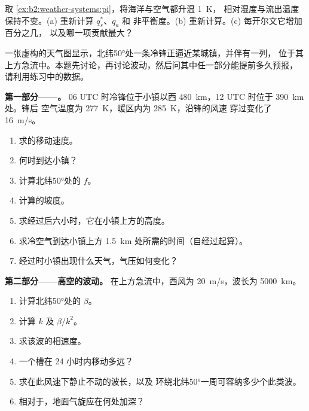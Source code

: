\begin{exercise}[$\star\star\star$]\label{exo:b2:weather-systems:12}
取 \cref{ex:b2:weather-systems:pi}，将海洋与空气都升温 \qty{1}{K}，
相对湿度与流出温度保持不变。(a) 重新计算 $q_s^*$、$q_a$ 和
非平衡度。(b) 重新计算。(c) 每开尔文它增加百分之几，
以及哪一项贡献最大？
\end{exercise}

\begin{problem}\label{pb:b2:weather-systems:1}
一张虚构的天气图显示，北纬\ang{50}处一条冷锋正逼近某城镇，并伴有一列，
位于其上方急流中。本题先讨论，再讨论波动，然后问其中任一部分能提前多久预报，
请利用练习中的数据。

\medskip\noindent\textbf{第一部分——。}
06 UTC 时冷锋位于小镇以西 \qty{480}{km}，12 UTC 时位于 \qty{390}{km} 处。锋后
空气温度为 \qty{277}{K}，暖区内为 \qty{285}{K}，沿锋的风速
穿过变化了 \qty{16}{m/s}。
\begin{enumerate}
  \item 求的移动速度。
  \item {}何时到达小镇？
  \item 计算北纬\ang{50}处的 $f$。
  \item 计算的坡度。
  \item 求经过后六小时，它在小镇上方的高度。
  \item 求冷空气到达小镇上方 \qty{1.5}{km} 处所需的时间（自经过起算）。
  \item {}经过时小镇出现什么天气，气压如何变化？
\end{enumerate}

\medskip\noindent\textbf{第二部分——高空的波动。}
在上方急流中，西风为 \qty{20}{m/s}，波长为 \qty{5000}{km}。
\begin{enumerate}[resume]
  \item 计算北纬\ang{50}处的 $\beta$。
  \item 计算 $k$ 及 $\beta/k^2$。
  \item 求该波的相速度。
  \item 一个槽在 24 小时内移动多远？
  \item 求在此风速下静止不动的波长，以及
        环绕北纬\ang{50}一周可容纳多少个此类波。
  \item 相对于，地面气旋应在何处加深？
\end{enumerate}


\end{problem}
